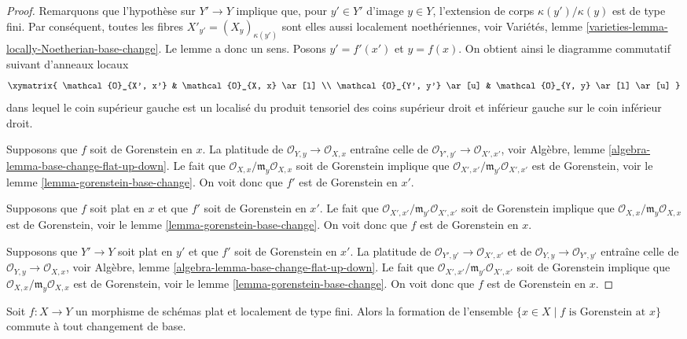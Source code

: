 \begin{proof}
Remarquons que l'hypothèse sur $Y' \to Y$ implique que, pour $y' \in Y'$ d'image $y \in Y$, l'extension de corps $\kappa(y')/\kappa(y)$ est de type fini. Par conséquent, toutes les fibres $X'_{y'} = (X_y)_{\kappa(y')}$ sont elles aussi localement noethériennes, voir Variétés, lemme \ref{varieties-lemma-locally-Noetherian-base-change}. Le lemme a donc un sens. Posons $y' = f'(x')$ et $y = f(x)$. On obtient ainsi le diagramme commutatif suivant d'anneaux locaux
$$
\xymatrix{
\mathcal{O}_{X', x'} & \mathcal{O}_{X, x} \ar[l] \\
\mathcal{O}_{Y', y'} \ar[u] & \mathcal{O}_{Y, y} \ar[l] \ar[u]
}
$$
dans lequel le coin supérieur gauche est un localisé du produit tensoriel des coins supérieur droit et inférieur gauche sur le coin inférieur droit.

\medskip\noindent
Supposons que $f$ soit de Gorenstein en $x$. La platitude de $\mathcal{O}_{Y, y} \to \mathcal{O}_{X, x}$ entraîne celle de $\mathcal{O}_{Y', y'} \to \mathcal{O}_{X', x'}$, voir Algèbre, lemme \ref{algebra-lemma-base-change-flat-up-down}. Le fait que $\mathcal{O}_{X, x}/\mathfrak m_y\mathcal{O}_{X, x}$ soit de Gorenstein implique que $\mathcal{O}_{X', x'}/\mathfrak m_{y'}\mathcal{O}_{X', x'}$ est de Gorenstein, voir le lemme \ref{lemma-gorenstein-base-change}. On voit donc que $f'$ est de Gorenstein en $x'$.

\medskip\noindent
Supposons que $f$ soit plat en $x$ et que $f'$ soit de Gorenstein en $x'$. Le fait que $\mathcal{O}_{X', x'}/\mathfrak m_{y'}\mathcal{O}_{X', x'}$ soit de Gorenstein implique que $\mathcal{O}_{X, x}/\mathfrak m_y\mathcal{O}_{X, x}$ est de Gorenstein, voir le lemme \ref{lemma-gorenstein-base-change}. On voit donc que $f$ est de Gorenstein en $x$.

\medskip\noindent
Supposons que $Y' \to Y$ soit plat en $y'$ et que $f'$ soit de Gorenstein en $x'$. La platitude de $\mathcal{O}_{Y', y'} \to \mathcal{O}_{X', x'}$ et de $\mathcal{O}_{Y, y} \to \mathcal{O}_{Y', y'}$ entraîne celle de $\mathcal{O}_{Y, y} \to \mathcal{O}_{X, x}$, voir Algèbre, lemme \ref{algebra-lemma-base-change-flat-up-down}. Le fait que $\mathcal{O}_{X', x'}/\mathfrak m_{y'}\mathcal{O}_{X', x'}$ soit de Gorenstein implique que $\mathcal{O}_{X, x}/\mathfrak m_y\mathcal{O}_{X, x}$ est de Gorenstein, voir le lemme \ref{lemma-gorenstein-base-change}. On voit donc que $f$ est de Gorenstein en $x$.
\end{proof}

\begin{lemma}
\label{lemma-flat-lft-base-change-gorenstein}
Soit $f : X \to Y$ un morphisme de schémas plat et localement de type fini. Alors la formation de l'ensemble
$\{x \in X \mid f\text{ is Gorenstein at }x\}$
commute à tout changement de base.
\end{lemma}


